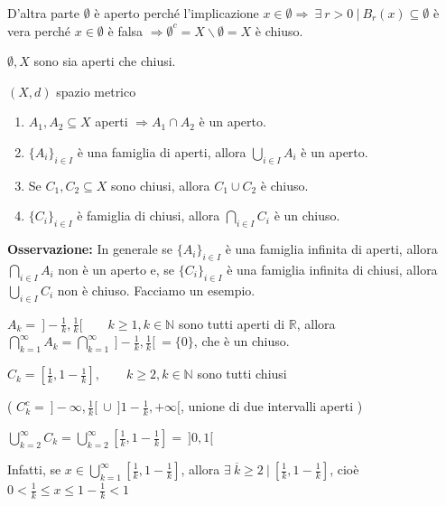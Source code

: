 	D'altra parte $\emptyset $ è aperto perché l'implicazione $x \in \emptyset \Rightarrow  \ \exists \ r > 0 \ \big| \ B_r(x) \subseteq \emptyset$ è vera perché $x \in \emptyset$  è falsa $\Rightarrow \emptyset^c = X \backslash \emptyset = X$ è chiuso. 
	
	\begin{attbar}
		$\emptyset, X$ sono sia aperti che chiusi.
	\end{attbar}


\begin{theorem}
	
	$(X,d)$ spazio metrico
	\begin{enumerate}
		\item $A_1, A_2 \subseteq X$ aperti $\Rightarrow A_1 \cap A_2$ è un aperto.
		 
		\item $\{A_i\}_{i \in I}$ è una famiglia di aperti, allora $\bigcup_{i \in I} A_i$ è un aperto.
		
		\item Se $C_1, C_2 \subseteq X$ sono chiusi, allora $C_1 \cup C_2$ è chiuso.
		
		\item $\{C_i\}_{i\in I}$ è famiglia di chiusi, allora $\bigcap_{i \in I} C_i$ è un chiuso.
	\end{enumerate}
\end{theorem}


\textbf{Osservazione:} 
In generale se $\{ A_i \}_{i \in I}$ è una famiglia infinita di aperti, allora $\bigcap_{i \in I} A_i$ non è un aperto e, se $\{ C_i \}_{i \in I}$ è una famiglia infinita di chiusi, allora $\bigcup_{i \in I} C_i$ non è chiuso. Facciamo un esempio.

$A_k= \ \bigg]-\frac{1}{k}, \frac{1}{k} \bigg[ \qquad k \geq 1, k \in \mathbb{N}$ sono tutti aperti di $\mathbb{R}$, allora $\bigcap_{k=1}^\infty A_k = \bigcap_{k=1}^\infty \ \bigg] -\frac{1}{k}, \frac{1}{k} \bigg[ \ = \{ 0 \}$, che è un chiuso.

$C_k = \left[ \frac{1}{k}, 1-\frac{1}{k} \right], \qquad k \geq 2, k \in \mathbb{N}$ sono tutti chiusi 

\bigg( $C_k^c = \ \bigg] -\infty, \frac{1}{k} \bigg[ \ \cup \ \bigg] 1-\frac{1}{k}, +\infty \bigg[$, unione di due intervalli aperti \bigg)

$\bigcup_{k=2}^\infty C_k = \bigcup_{k=2}^\infty \left[ \frac{1}{k}, 1-\frac{1}{k} \right] = \ ]0,1[$

Infatti, se $x \in \bigcup_{k=1}^\infty \left[ \frac{1}{k}, 1-\frac{1}{k} \right]$, allora $\exists \ \overline{k} \geq 2 \ \big| \ \left[\frac{1}{k}, 1-\frac{1}{k}\right]$, cioè $0 < \frac{1}{k} \leq x \leq 1- \frac{1}{k} < 1$


